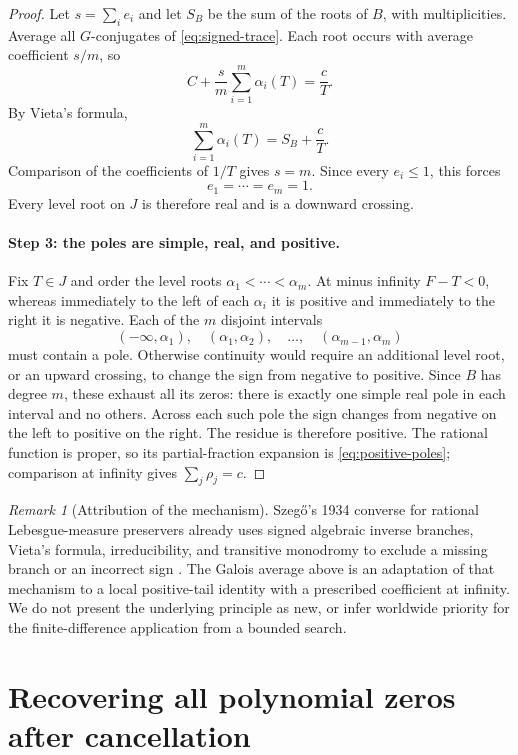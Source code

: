 \documentclass[11pt,a4paper]{article}
\theoremstyle{remark}
\newtheorem{remark}[theorem]{Remark}
\begin{document}
\begin{proof}
Let $s=\sum_i e_i$ and let $S_B$ be the sum of the roots of $B$,
with multiplicities. Average all $G$-conjugates of
\eqref{eq:signed-trace}. Each root occurs with average coefficient
$s/m$, so
\[
 C+\frac{s}{m}\sum_{i=1}^m\alpha_i(T)=\frac cT.
\]
By Vieta's formula,
\[
 \sum_{i=1}^m\alpha_i(T)=S_B+\frac cT.
\]
Comparison of the coefficients of $1/T$ gives $s=m$. Since every
$e_i\le1$, this forces
\[
 e_1=\cdots=e_m=1.
\]
Every level root on $J$ is therefore real and is a downward crossing.

\paragraph{Step 3: the poles are simple, real, and positive.}
Fix $T\in J$ and order the level roots
$\alpha_1<\cdots<\alpha_m$. At minus infinity $F-T<0$, whereas
immediately to the left of each $\alpha_i$ it is positive and
immediately to the right it is negative. Each of the $m$ disjoint
intervals
\[
 (-\infty,\alpha_1),\quad
 (\alpha_1,\alpha_2),\quad\ldots,\quad
 (\alpha_{m-1},\alpha_m)
\]
must contain a pole. Otherwise continuity would require an additional
level root, or an upward crossing, to change the sign from negative
to positive. Since $B$ has degree $m$, these exhaust all its zeros:
there is exactly one simple real pole in each interval and no others.
Across each such pole the sign changes from negative on the left to
positive on the right. The residue is therefore positive.
The rational function is proper, so its partial-fraction expansion is
\eqref{eq:positive-poles}; comparison at infinity gives
$\sum_j\rho_j=c$.
\end{proof}

\begin{remark}[Attribution of the mechanism]\label{rem:szego}
Szeg\H{o}'s 1934 converse for rational Lebesgue-measure preservers
already uses signed algebraic inverse branches, Vieta's formula,
irreducibility, and transitive monodromy to exclude a missing branch
or an incorrect sign \cite[pp.~19--20]{Szego1934}.
The Galois average above is an adaptation of that mechanism to a local
positive-tail identity with a prescribed coefficient at infinity.
We do not present the underlying principle as new, or infer worldwide
priority for the finite-difference application from a bounded search.
\end{remark}

\section{Recovering all polynomial zeros after cancellation}
\label{sec:recover}
\end{document}
